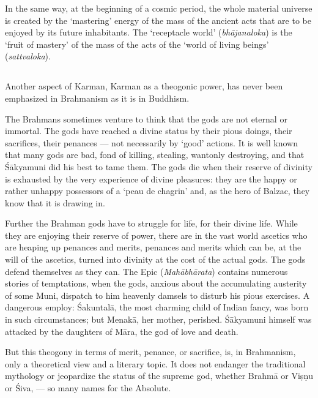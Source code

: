 \documentclass[a4paper, 11pt, oneside, english]{article}
\begin{document}
In the same way, at the beginning of a cosmic period, the whole material universe is created by the `mastering' energy of the mass of the ancient acts that are to be enjoyed by its future inhabitants. The `receptacle world' (\emph{bhājanaloka}) is the `fruit of mastery' of the mass of the acts of the `world of living beings' (\emph{sattvaloka}).

\subsection{}
\paragraph{}
Another aspect of Karman, Karman as a theogonic power, has never been emphasized in Brahmanism as it is in Buddhism.

The Brahmans sometimes venture to think that the gods are not eternal or immortal. The gods have reached a divine status by their pious doings, their sacrifices, their penances --- not necessarily by `good' actions. It is well known that many gods are bad, fond of killing, stealing, wantonly destroying, and that Śākyamuni did his best to tame them. The gods die when their reserve of divinity is exhausted by the very experience of divine pleasures: they are the happy or rather unhappy possessors of a `peau de chagrin' and, as the hero of Balzac, they know that it is drawing in.

Further the Brahman gods have to struggle for life, for their divine life. While they are enjoying their reserve of power, there are in the vast world ascetics who are heaping up penances and merits, penances and merits which can be, at the will of the ascetics, turned into divinity at the cost of the actual gods. The gods defend themselves as they can. The Epic (\emph{Mahābhārata}) contains numerous stories of temptations, when the gods, anxious about the accumulating austerity of some Muni, dispatch to him heavenly damsels to disturb his pious exercises. A dangerous employ: Śakuntalā, the most charming child of Indian fancy, was born in such circumstances; but Menakā, her mother, perished. Śākyamuni himself was attacked by the daughters of Māra, the god of love and death.

But this theogony in terms of merit, penance, or sacrifice, is, in Brahmanism, only a theoretical view and a literary topic. It does not endanger the traditional mythology or jeopardize the status of the supreme god, whether Brahmā or Viṣṇu or Śiva, --- so many names for the Absolute.
\end{document}
